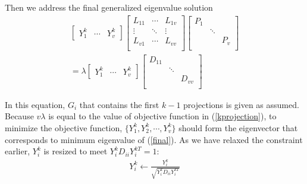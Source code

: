 \documentclass[journal]{IEEEtran}
\begin{document}
Then we address the final generalized eigenvalue solution
\begin{gather}
\label{final}
\left[
\begin{array}{ccc}
Y_1^{k}  &\cdots &Y_v^{k}
\end{array}
\right]
\left[
\begin{array}{ccc}
L_{11}  &\cdots & L_{1v} \\
\vdots & \ddots & \vdots  \\
L_{v1} & \cdots & L_{vv} \\
\end{array}
\right]
\left[
\begin{array}{ccc}
P_1  &  &  \\
 & \ddots &  \\
 &  & P_v \\
\end{array}
\right] \\
=\lambda 
\left[
\begin{array}{ccc}
Y_1^{k}  &\cdots &Y_v^{k}
\end{array}
\right]
\left[
\begin{array}{ccc} 
D_{11}  &  & \\
 & \ddots &  \\
 &  &  D_{vv} \\
\end{array}
\right] \nonumber
\end{gather}

In this equation, $G_i$ that contains the first $k-1$ projections is given as assumed. 
Because $v\lambda$ is equal to the value of objective function in (\ref{kprojection}), to minimize the objective function, $\{Y_1^k, Y_2^k, \cdots, Y_v^k \}$ should form the eigenvector that corresponds to minimum eigenvalue of (\ref{final}). 
As we have relaxed the constraint earlier, $Y_i^k$ is resized to meet $Y_i^k D_{ii} Y_i^{kT}=1$: 
\begin{gather}
Y_i^k \gets \frac{Y_i^k}{\sqrt{Y_i^k D_{ii} Y_i^{kT}}}
\end{gather}
\end{document}
